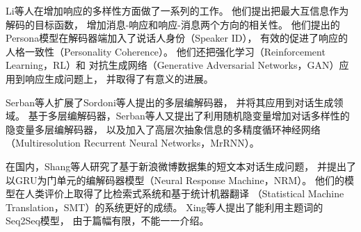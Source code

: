 Li等人在增加响应的多样性方面做了一系列的工作。
他们提出把最大互信息作为解码的目标函数，
增加消息-响应和响应-消息两个方向的相关性。
他们提出的Persona模型在解码器端加入了说话人身份（Speaker ID），
有效的促进了响应的人格一致性（Personality Coherence）。
他们还把强化学习（Reinforcement Learning，RL）和
对抗生成网络（Generative Adversarial Networks，GAN）应用到响应生成问题上，
并取得了有意义的进展。

Serban等人扩展了Sordoni等人提出的多层编解码器，
并将其应用到对话生成领域。
基于多层编解码器，Serban等人又提出了利用随机隐变量增加对话多样性的隐变量多层编解码器，
以及加入了高层次抽象信息的多精度循环神经网络（Multiresolution Recurrent Neural Networks，MrRNN）。

在国内，Shang等人研究了基于新浪微博数据集的短文本对话生成问题，
并提出了以GRU为门单元的编解码器模型（Neural Response Machine，NRM）。
他们的模型在人类评价上取得了比检索式系统和基于统计机器翻译
（Statistical Machine Translation，SMT）的系统更好的成绩。
Xing等人提出了能利用主题词的Seq2Seq模型，
由于篇幅有限，不能一一介绍。


